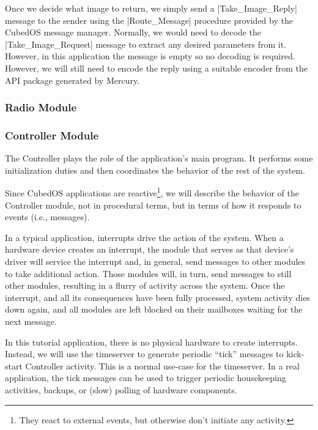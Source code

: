 Once we decide what image to return, we simply send a |Take_Image_Reply| message to the sender
using the |Route_Message| procedure provided by the CubedOS message manager. Normally, we would
need to decode the |Take_Image_Request| message to extract any desired parameters from it.
However, in this application the message is empty so no decoding is required. However, we will
still need to encode the reply using a suitable encoder from the API package generated by
Mercury.

\subsubsection{Radio Module}
  



\subsubsection{Controller Module}

The Controller plays the role of the application's main program. It performs some initialization
duties and then coordinates the behavior of the rest of the system.

Since CubedOS applications are reactive\footnote{They react to external events, but otherwise
don't initiate any activity.}, we will describe the behavior of the Controller module, not in
procedural terms, but in terms of how it responds to events (i.e., messages).

In a typical application, interrupts drive the action of the system. When a hardware device
creates an interrupt, the module that serves as that device's driver will service the interrupt
and, in general, send messages to other modules to take additional action. Those modules will,
in turn, send messages to still other modules, resulting in a flurry of activity across the
system. Once the interrupt, and all its consequences have been fully processed, system activity
dies down again, and all modules are left blocked on their mailboxes waiting for the next
message.

In this tutorial application, there is no physical hardware to create interrupts. Instead, we
will use the timeserver to generate periodic ``tick'' messages to kick-start Controller
activity. This is a normal use-case for the timeserver. In a real application, the tick messages
can be used to trigger periodic housekeeping activities, backups, or (slow) polling of hardware
components.

